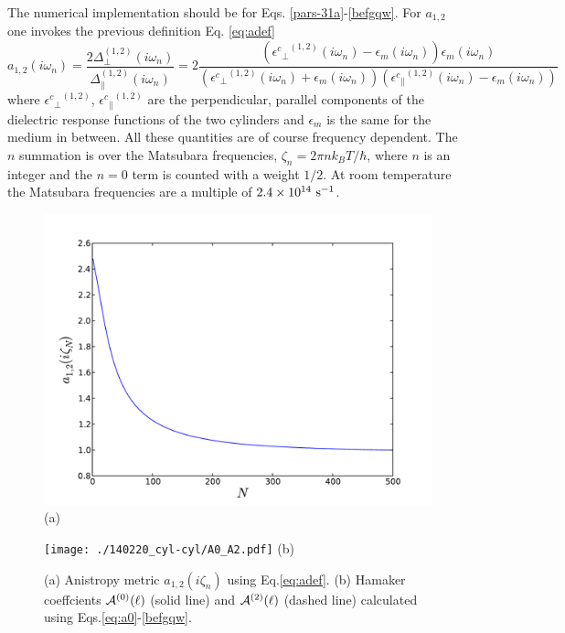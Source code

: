 \documentclass[onecolumn,letterpaper,amsmath,amssymb,floatfix,aps,superscriptaddress]{revtex4}
\begin{document}
The numerical implementation should be for Eqs. \ref{pars-31a}-\ref{befgqw}. For $a_{1,2}$ one invokes the previous definition Eq. \ref{eq:adef}
\begin{equation}
a_{1,2}(i \omega_n) = \frac{2 \Delta_{\perp}^{(1,2)}(i \omega_n)}{\Delta_{\parallel}^{(1,2)}(i \omega_n)} = 2 \frac{({{\epsilon^{c}}_{\perp}}^{(1,2)}(i \omega_n) -\epsilon_{m}(i \omega_n)) \epsilon_{m}(i \omega_n)}{({{\epsilon^{c}}_{\perp}}^{(1,2)}(i \omega_n)+\epsilon_{m}(i \omega_n)) ({{\epsilon^{c}}_{\parallel}}^{(1,2)}(i \omega_n) -\epsilon_{m}(i \omega_n))}
\label{eq:adef}
\end{equation}
where ${{\epsilon^{c}}_{\perp}}^{(1,2)}$, ${{\epsilon^{c}}_{\parallel}}^{(1,2)}$ are the perpendicular, parallel components of the dielectric response functions of the two cylinders and $\epsilon_{m}$ is the same for the medium in between. All these quantities are of course frequency dependent. The $n$ summation is over the Matsubara frequencies, $\zeta_n = 2\pi n k_BT/\hbar$, where $n$ is an integer and the $n=0$ term is counted with a weight $1/2$. At room temperature the Matsubara frequencies are a multiple of $\rm 2.4 \times 10^{14}~s^{-1}$.

\begin{figure}%
\begin{center}
\begin{minipage}[b]{0.40\textwidth}
\begin{center}
\includegraphics[width=1.2\textwidth]{./140220_cyl-cyl/aiz.pdf} (a)
\end{center}
\end{minipage}
\hskip 43pt
\begin{minipage}[b]{0.40\textwidth}
\begin{center}
\texttt{[image: ./140220\_cyl-cyl/A0\_A2.pdf]} (b)
\end{center}
\end{minipage}
\caption{(a) Anistropy metric $a_{1,2}(i\zeta_n)$ using Eq.\ref{eq:adef}. (b) Hamaker coeffcients ${\cal A}^{(0)}(\ell)$ (solid line) and ${\cal A}^{(2)}(\ell)$ (dashed line) calculated using Eqs.\ref{eq:a0}-\ref{befgqw}.}
\label{fiddle1}
\end{center}
\end{figure} 
\end{document}
